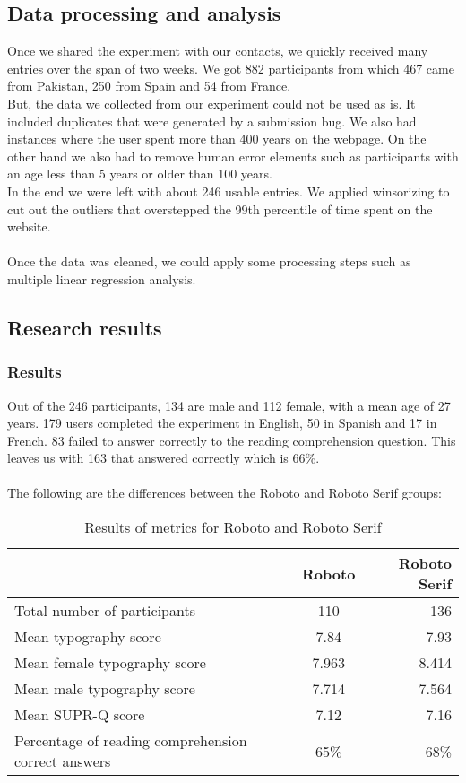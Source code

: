 \documentclass{article}
\begin{document}
\subsection{Data processing and analysis}
Once we shared the experiment with our contacts, we quickly received many entries over the span of two weeks.
We got 882 participants from which 467 came from Pakistan, 250 from Spain and 54 from France.
\\
But, the data we collected from our experiment could not be used as is. It included duplicates that were generated by a submission bug. We also had instances where the user spent more than 400 years on the webpage. On the other hand we also had to remove human error elements such as participants with an age less than 5 years or older than 100 years.
\\
In the end we were left with about 246 usable entries.
We applied winsorizing to cut out the outliers that overstepped the 99th percentile of time spent on the website.
\\\\
Once the data was cleaned, we could apply some processing steps such as multiple linear regression analysis.

\subsection{Research results}

\subsubsection{Results}
Out of the 246 participants, 134 are male and 112 female, with a mean age of 27 years. 179 users completed the experiment in English, 50 in Spanish and 17 in French. 83 failed to answer correctly to the reading comprehension question. This leaves us with 163 that answered correctly which is 66\%.
\\\\
The following are the differences between the Roboto and Roboto Serif groups:

\begin{table}[H]
\centering
\begin{tabular}{ l|c|r } 
    & \textbf{Roboto} & \textbf{Roboto Serif} \\
    \hline
    Total number of participants & 110 &  136 \\ 
    Mean typography score & 7.84 & 7.93 \\ 
    Mean female typography score & 7.963 &  8.414\\
    Mean male typography score & 7.714 & 7.564 \\ 
    Mean SUPR-Q score & 7.12 & 7.16 \\ 
    Percentage of reading comprehension correct answers & 65\% & 68\% \\
\end{tabular}
\caption{\label{tab:difffonts}Results of metrics for Roboto and Roboto Serif}
\end{table}
\end{document}
